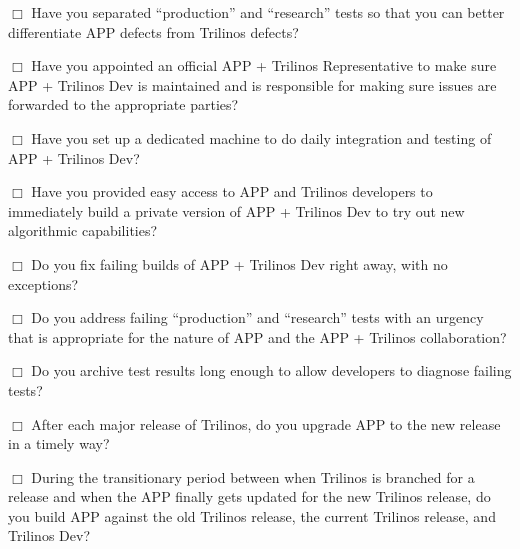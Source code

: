 \documentclass[pdf,ps2pdf,11pt]{SANDreport}
\begin{document}
$\Box$ Have you separated ``production'' and ``research'' tests so that you
can better differentiate APP defects from Trilinos defects?

$\Box$ Have you appointed an official APP + Trilinos Representative to make
sure APP + Trilinos Dev is maintained and is responsible for making sure
issues are forwarded to the appropriate parties?

$\Box$ Have you set up a dedicated machine to do daily integration and testing
of APP + Trilinos Dev?

$\Box$ Have you provided easy access to APP and Trilinos developers to
immediately build a private version of APP + Trilinos Dev to try out new
algorithmic capabilities?

$\Box$ Do you fix failing builds of APP + Trilinos Dev right away, with no
exceptions?

$\Box$ Do you address failing ``production'' and ``research'' tests with an
urgency that is appropriate for the nature of APP and the APP + Trilinos
collaboration?

$\Box$ Do you archive test results long enough to allow developers to diagnose
failing tests?

$\Box$ After each major release of Trilinos, do you upgrade APP to the new
release in a timely way?

$\Box$ During the transitionary period between when Trilinos is branched for a
release and when the APP finally gets updated for the new Trilinos release, do
you build APP against the old Trilinos release, the current Trilinos release,
and Trilinos Dev?


\end{document}

